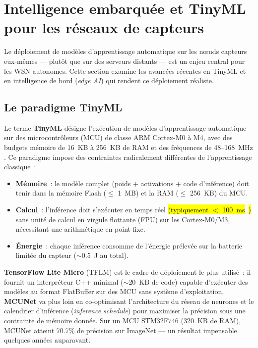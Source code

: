 \section{Intelligence embarquée et TinyML pour les réseaux de capteurs}\label{sec:revlit-tinyml}

Le déploiement de modèles d'apprentissage automatique sur les n\oe{}uds capteurs eux-mêmes --- plutôt que sur des serveurs distants --- est un enjeu central pour les WSN autonomes. Cette section examine les avancées récentes en TinyML et en intelligence de bord (\emph{edge AI}) qui rendent ce déploiement réaliste.

\subsection{Le paradigme TinyML}

Le terme \textbf{TinyML} désigne l'exécution de modèles d'apprentissage automatique sur des microcontrôleurs (MCU) de classe ARM Cortex-M0 à M4, avec des budgets mémoire de 16~KB à 256~KB de RAM et des fréquences de 48--168~MHz \cite{Warden2020TinyML,tinyml_review_acm2024}. Ce paradigme impose des contraintes radicalement différentes de l'apprentissage classique~:

\begin{itemize}
    \item \textbf{Mémoire}~: le modèle complet (poids + activations + code d'inférence) doit tenir dans la mémoire Flash ($\leq$ 1~MB) et la RAM ($\leq$ 256~KB) du MCU.
    \item \textbf{Calcul}~: l'inférence doit s'exécuter en temps réel \hl{(typiquement $<$ 100~ms}~\cite{Warden2020TinyML}\hl{)} sans unité de calcul en virgule flottante (FPU) sur les Cortex-M0/M3, nécessitant une arithmétique en point fixe.
    \item \textbf{Énergie}~: chaque inférence consomme de l'énergie prélevée sur la batterie limitée du capteur ($\sim$0.5~J au total).
\end{itemize}

\textbf{TensorFlow Lite Micro} (TFLM) \cite{david2021tensorflow} est le cadre de déploiement le plus utilisé~: il fournit un interpréteur C++ minimal ($\sim$20~KB de code) capable d'exécuter des modèles au format FlatBuffer sur des MCU sans système d'exploitation. \textbf{MCUNet} \cite{Lin2020MCUNet} va plus loin en co-optimisant l'architecture du réseau de neurones et le calendrier d'inférence (\emph{inference schedule}) pour maximiser la précision sous une contrainte de mémoire donnée. Sur un MCU STM32F746 (320~KB de RAM), MCUNet atteint 70.7\% de précision sur ImageNet --- un résultat impensable quelques années auparavant.

